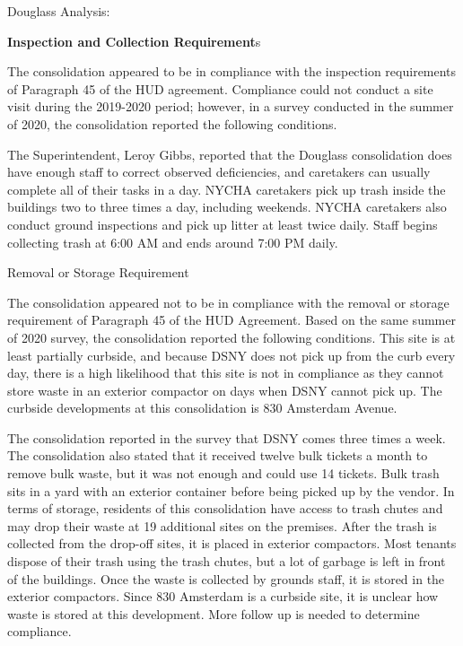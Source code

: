 Douglass Analysis: 



\textbf{Inspection and Collection Requirement}s 

 

The consolidation appeared to be in compliance with the inspection requirements of Paragraph 45 of the HUD agreement. Compliance could not conduct a site visit during the 2019-2020 period; however, in a survey conducted in the summer of 2020, the consolidation reported the following conditions.



The Superintendent, Leroy Gibbs, reported that the Douglass consolidation does have enough staff to correct observed deficiencies, and caretakers can usually complete all of their tasks in a day. NYCHA caretakers pick up trash inside the buildings two to three times a day, including weekends. NYCHA caretakers also conduct ground inspections and pick up litter at least twice daily. Staff begins collecting trash at 6:00 AM and ends around 7:00 PM daily. 



Removal or Storage Requirement 



The consolidation appeared not to be in compliance with the removal or storage requirement of Paragraph  45 of the HUD Agreement. Based on the same summer of  2020 survey, the consolidation reported the following conditions. This site is at least partially curbside, and because DSNY does not pick up from the curb every day, there is a high likelihood that this site is not in compliance as they cannot store waste in an exterior compactor on days when DSNY cannot pick up. The curbside developments at this consolidation is 830 Amsterdam Avenue. 

 

The consolidation reported in the survey that DSNY comes three times a week. The consolidation also stated that it received twelve bulk tickets a month to remove bulk waste, but it was not enough and could use 14 tickets. Bulk trash sits in a yard with an exterior container before being picked up by the vendor. In terms of storage, residents of this consolidation have access to trash chutes and may drop their waste at 19 additional sites on the premises. After the trash is collected from the drop-off sites, it is placed in exterior compactors. Most tenants dispose of their trash using the trash chutes, but a lot of garbage is left in front of the buildings. Once the waste is collected by grounds staff, it is stored in the exterior compactors. Since 830 Amsterdam is a curbside site, it is unclear how waste is stored at this development. More follow up is needed to determine compliance.



